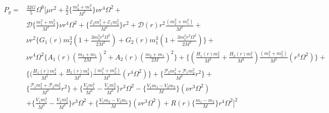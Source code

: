 \begin{tcolorbox}[thesisresultbox, title=Gravitational Radiation Power]
\restorethesisbodyformat
\begin{equation}
\begin{aligned}
     P_g=&\frac{32G}{5}\Omega^6\Bigg[\mu r^2+\frac{3}{2}\Bigg\{\frac{m_2^3+m_1^3}{M^2}\Bigg\}\nu r^4\Omega^2+\\&\mathcal{D}\Bigg\{\frac{m_1^2+m_2^2}{M^2}\Bigg\}\nu r^4\Omega^2+\Bigg\{\frac{\mathcal{E}_2m_1^2+\mathcal{E}_1m_2^2}{M^2}\Bigg\}r^2+\mathcal{D}(r)r^2\frac{(m_2^2+m_1^2)}{M^2}+\\&\nu r^2\Bigg\{G_1(r)m_2^3(1+\frac{3m_2^2r^2\Omega^2}{2M^2})+G_2(r)m_1^3(1+\frac{3m_1^2r^2\Omega^2}{2M^2})\Bigg\}+\\&\nu r^4\Omega^2\Bigg\{A_1(r)(\frac{m_2+m_1}{2M})^2+A_2(r)(\frac{m_2+m_1}{2M})^2\Bigg\}+\Bigg\{(\frac{H_1(r)m_2^2}{ M^2}+\frac{H_2(r)m_1^2}{ M^2})\frac{(m_1^2+m_2^2)}{M^2}(r^4\Omega^2)\Bigg\}+\\&\Bigg\{\Big(\frac{H_1(r)m_1^2}{ M^2}+\frac{H_2(r)m_2^2}{ M^2}\Big)\frac{(m_1^2+m_2^2)}{M^2}(r^4\Omega^2)\Bigg\}+\Bigg\{\frac{\mathcal{P}_2m_1^2+\mathcal{P}_1m_2^2}{M^2}r^2\Bigg\}+\\&
       \Bigg\{\frac{\mathcal{P}_1m_1^2+\mathcal{P}_2m_2^2}{M^2}r^2\Bigg\}+\Bigg\{\frac{V_2m_1^3}{M^3}-\frac{V_1m_2^3}{M^3}\Bigg\}r^3\Omega^2-
       \Bigg\{\frac{V_1m_1-V_2m_2}{M}\Bigg\}(\nu r^3 \Omega^2)\\&+\Bigg\{\frac{{V}_1m_1^3}{M^3}-\frac{{V}_2m_2^3}{M^3}\Bigg\}r^3\Omega^2+
       \Bigg\{\frac{{V}_1m_2-{V}_2m_1}{M}\Bigg\}(\nu r^3 \Omega^2)+R(r)\Bigg\{\frac{m_1-m_2}{M}\Bigg\}r^4\Omega^2\Bigg]^2
\end{aligned}
\label{5.81n}
\end{equation}
\end{tcolorbox}

